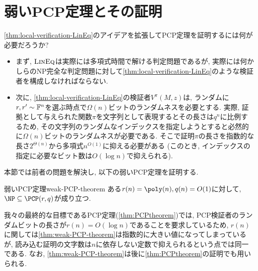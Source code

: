 \section{弱いPCP定理とその証明}
\cref{thm:local-verification-LinEq}のアイデアを拡張してPCP定理を証明するには何が必要だろうか?
\begin{itemize}
  \item まず, $\textsc{LinEq}$は実際には多項式時間で解ける判定問題であるが, 実際には何かしらのNP完全な判定問題に対して\cref{thm:local-verification-LinEq}のような検証者を構成しなければならない.  
  \item 次に, \cref{thm:local-verification-LinEq}の検証者$V^\pi(M,z)$は, ランダムに$r,r'\sim\mathbb{F}^n$を選ぶ時点で$\Omega(n)$ビットのランダムネスを必要とする. 実際, 証拠として与えられた関数$\pi$を文字列として表現するとその長さは$q^n$に比例するため, その文字列のランダムなインデックスを指定しようとすると必然的に$\Omega(n)$ビットのランダムネスが必要である. そこで証明$\pi$の長さを指数的な長さ$2^{\Theta(n)}$から多項式$n^{O(1)}$に抑える必要がある (このとき, インデックスの指定に必要なビット数は$O(\log n)$で抑えられる).
\end{itemize}

本節では前者の問題を解決し, 以下の弱いPCP定理を証明する.
\begin{theorem}{弱いPCP定理}{weak-PCP-theorem}
  ある$r(n)=\poly(n),q(n)=O(1)$に対して, $\NP \subseteq \PCP(r,q)$が成り立つ.
\end{theorem}

我々の最終的な目標であるPCP定理(\cref{thm:PCPtheorem})では, PCP検証者のランダムビットの長さが$r(n)=O(\log n)$であることを要求しているため, $r(n)$に関しては\cref{thm:weak-PCP-theorem}は指数的に大きい値になってしまっているが, 読み込む証明の文字数は$n$に依存しない定数で抑えられるという点では同一である.
なお, \cref{thm:weak-PCP-theorem}は後に\cref{thm:PCPtheorem}の証明でも用いられる.

